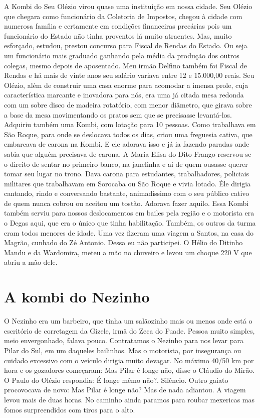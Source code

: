 \documentclass[12pt,brazil,]{book}
\begin{document}
A Kombi do Seu Olézio virou quase uma instituição em nossa cidade. Seu
Olézio que chegara como funcionário da Coletoria de Impostos, chegou à
cidade com numerosa família e certamente em condições financeiras
precárias pois um funcionário do Estado não tinha proventos lá muito
atraentes. Mas, muito esforçado, estudou, prestou concurso para Fiscal
de Rendas do Estado. Ou seja um funcionário mais graduado ganhando pela
média da produção dos outros colegas, mesmo depois de aposentado. Meu
irmão Delfino também foi Fiscal de Rendas e há mais de vinte anos seu
salário variava entre 12 e 15.000,00 reais. Seu Olézio, além de
construir uma casa enorme para acomodar a imensa prole, cuja
característica marcante e inovadora para nós, era uma já citada mesa
redonda com um sobre disco de madeira rotatório, com menor diâmetro, que
girava sobre a base da mesa movimentando os pratos sem que se precisasse
levantá-los. Adquiriu também uma Kombi, com lotação para 10 pessoas.
Como trabalhava em São Roque, para onde se deslocava todos os dias,
criou uma freguesia cativa, que embarcava de carona na Kombi. E ele
adorava isso e já ia fazendo paradas onde sabia que alguém precisava de
carona. A Maria Elisa do Dito Frango reservou-se o direito de sentar no
primeiro banco, na janelinha e ai de quem ousasse querer tomar seu lugar
no trono. Dava carona para estudantes, trabalhadores, policiais
militares que trabalhavam em Sorocaba ou São Roque e vivia lotado. Êle
dirigia cantando, rindo e conversando bastante, animadíssimo com o seu
público cativo de quem nunca cobrou ou aceitou um tostão. Adorava fazer
aquilo. Essa Kombi também serviu para nossos deslocamentos em bailes
pela região e o motorista era o Degas aqui, que era o único que tinha
habilitação. Também, os outros da turma eram todos menores de idade. Uma
vez fizeram uma viagem a Santos, na casa do Magrão, cunhado do Zé
Antonio. Dessa eu não participei. O Hélio do Ditinho Mandu e da
Wardomira, meteu a mão no chuveiro e levou um choque 220 V que abriu a
mão dele.

\section{A kombi do Nezinho}\label{a-kombi-do-nezinho}

O Nezinho era um barbeiro, que tinha um salãozinho mais ou menos onde
está o escritório de corretagem da Gizele, irmã do Zeca do Fuade. Pessoa
muito simples, meio envergonhado, falava pouco. Contratamos o Nezinho
para nos levar para Pilar do Sul, em um daqueles bailinhos. Mas o
motorista, por insegurança ou cuidado excessivo com o veículo dirigia
muito devagar. No máximo 40/50 km por hora e os gozadores começaram: Mas
Pilar é longe não, disse o Cláudio do Mirão. O Paulo do Olézio
respondia: É longe mêmo não?. Silêncio. Outro gaiato procovocava de
novo: Mas Pilar é longe não? Mas de nada adiantou. A viagem levou mais
de duas horas. No caminho ainda paramos para roubar mexericas mas fomos
surpreendidos com tiros para o alto.
\end{document}
